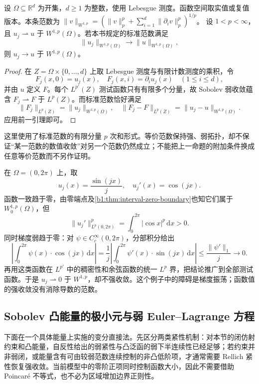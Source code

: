 \begin{proposition}\label{b1:prop:sobolev-weak-norm-strong}
设 \(\Omega\subseteq\mathbb R^d\) 为开集，\(d\geq1\) 为整数，使用 Lebesgue 测度。函数空间取实值或复值版本。本条范数为 \(\|v\|_{W^{1,p}}=(\|v\|_p^p+\sum_{i=1}^d\|\partial_i v\|_p^p)^{1/p}\)。
设 \(1<p<\infty\)，且 \(u_j\rightharpoonup u\) 于 \(W^{1,p}(\Omega)\)。若本书规定的标准范数满足
\[
 \|u_j\|_{W^{1,p}(\Omega)}
 \longrightarrow\|u\|_{W^{1,p}(\Omega)},
\]
则 \(u_j\to u\) 于 \(W^{1,p}(\Omega)\)。
\end{proposition}
\begin{proof}
在 \(Z=\Omega\times\{0,\ldots,d\}\) 上取 Lebesgue 测度与有限计数测度的乘积，令
\[
 F_j(x,0)=u_j(x),\quad F_j(x,i)=\partial_i u_j(x)
 \quad(1\le i\le d),
\]
并由 \(u\) 定义 \(F\)。每个 \(L^{p'}(Z)\) 测试函数只有有限多个分量，故 Sobolev 弱收敛蕴含 \(F_j\rightharpoonup F\) 于 \(L^p(Z)\)。而标准范数恰好满足
\[
 \|F_j\|_{L^p(Z)}=\|u_j\|_{W^{1,p}(\Omega)},\quad
 \|F_j-F\|_{L^p(Z)}=\|u_j-u\|_{W^{1,p}(\Omega)}.
\]
应用前一引理即可。
\end{proof}

这里使用了标准范数的有限分量 \(p\) 次和形式。等价范数保持强、弱拓扑，却不保证“某一范数的数值收敛”对另一个范数仍然成立；不能把上一命题的附加条件换成任意等价范数而不另作证明。

\ProseParagraphBreak

在 \(\Omega=(0,2\pi)\) 上，取
\[
 u_j(x)=\frac{\sin(jx)}j,\quad u_j'(x)=\cos(jx).
\]
函数一致趋于零，由零端点及\cref{b1:thm:interval-zero-boundary}也知它们属于 \(W_0^{1,p}(\Omega)\)，但
\[
 \|u_j'\|_{L^p(0,2\pi)}^p
 =\int_0^{2\pi}|\cos x|^p\,\mathrm dx>0.
\]
同时梯度弱趋于零：对 \(\psi\in C_c^\infty(0,2\pi)\)，分部积分给出
\[
 \left|\int_0^{2\pi}\psi(x)\cdot\cos(jx)\,\mathrm dx\right|
 =\frac1j\left|\int_0^{2\pi}\psi'(x)\cdot\sin(jx)\,\mathrm dx\right|
 \le\frac{\|\psi'\|_1}{j}\longrightarrow0.
\]
再用这类函数在 \(L^{p'}\) 中的稠密性和余弦函数的统一 \(L^p\) 界，把结论推广到全部测试函数。于是 \(u_j\rightharpoonup0\) 于 \(W^{1,p}\)，却不强收敛。这个例子中的障碍是梯度振荡；函数值的强收敛没有消除导数的范数。

\subsection{Sobolev 凸能量的极小元与弱 Euler--Lagrange 方程}
\label{b1:subsec:250304}

下面在一个具体能量上实施的变分直接法。先区分两类紧性机制：对本节的闭仿射约束和凸能量，自反性给出的弱紧性与凸泛函的弱下半连续性已经足够；若约束并非弱闭，或能量含有可由较弱范数连续控制的非凸低阶项，才通常需要 Rellich 紧性恢复强收敛。当前模型中的零阶正项同时控制函数大小，因此不需要借助 Poincaré 不等式，也不必为区域增加边界正则性。

